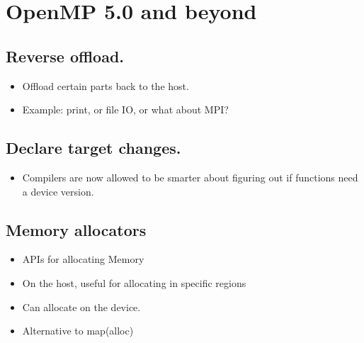 
\chapter{OpenMP 5.0 and beyond}
\label{chapter:future}


\section{Reverse offload.}
\begin{itemize}
    \item Offload certain parts back to the host.
    \item Example: print, or file IO, or what about MPI?
\end{itemize}

\section{Declare target changes.}
\begin{itemize}
    \item Compilers are now allowed to be smarter about figuring out if functions need a device version.
\end{itemize}

\section{Memory allocators}
\begin{itemize}
    \item APIs for allocating Memory
    \item On the host, useful for allocating in specific regions
    \item Can allocate on the device.
    \item Alternative to map(alloc)
\end{itemize}


